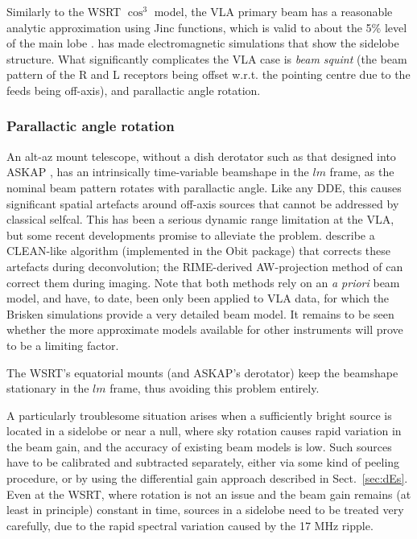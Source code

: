 \documentclass{aa}
\begin{document}
Similarly to the WSRT $\cos^3$ model, the VLA primary beam has a reasonable analytic approximation using Jinc functions, which is valid to about the 5\% level of the main lobe \citep{Uson-Cotton:VLA-beam}. \citet{Brisken:VLA-beam} has made electromagnetic simulations that show the sidelobe structure. What significantly complicates the VLA case is {\em beam squint} (the beam pattern of the R and L receptors being offset w.r.t. the pointing centre due to the feeds being off-axis), and parallactic angle rotation.

\subsubsection{Parallactic angle rotation}

An alt-az mount telescope, without a dish derotator such as that designed into ASKAP \citep{ASKAP}, has an intrinsically time-variable beamshape in the $lm$ frame, as the nominal beam pattern rotates with parallactic angle. Like any DDE, this causes significant spatial artefacts around off-axis sources that cannot be addressed by classical selfcal. This has been a serious dynamic range limitation at the VLA, but some recent developments promise to alleviate the problem. \citet{Uson-Cotton:VLA-beam} describe a CLEAN-like algorithm (implemented in the Obit package) that corrects these artefacts during deconvolution; the RIME-derived AW-projection method of \citet{SB:imageplane} can correct them during imaging. Note that both methods rely on an \emph{a priori} beam model, and have, to date, been only been applied to VLA data, for which the Brisken simulations provide a very detailed beam model. It remains to be seen whether the more approximate models available for other instruments will prove to be a limiting factor.

The WSRT's equatorial mounts (and ASKAP's derotator) keep the beamshape stationary in the $lm$ frame, thus avoiding this problem entirely.

A particularly troublesome situation arises when a sufficiently bright source is located in a sidelobe or near a null, where sky rotation causes rapid variation in the beam gain, and the accuracy of existing beam models is low. Such sources have to be calibrated and subtracted separately, either via some kind of peeling procedure, or by using the differential gain approach described in Sect.~\ref{sec:dEs}. Even at the WSRT, where rotation is not an issue and the beam gain remains (at least in principle) constant in time, sources in a sidelobe need to be treated very carefully, due to the rapid spectral variation caused by the 17 MHz ripple.
\end{document}
